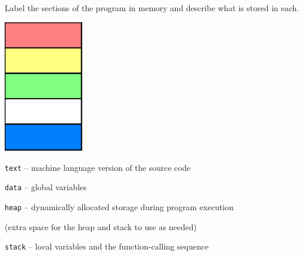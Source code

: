Label the sections of the program in memory and describe what is stored in each.

\begin{minipage}{0.2\textwidth}
	\includegraphics[width=35mm]{other/programstructure.png}
\end{minipage}
\begin{minipage}{0.7\textwidth}
	\begin{answer}

	\texttt{text} -- machine language version of the source code

	\bigskip \medskip

	\texttt{data} -- global variables

	\bigskip \medskip

	\texttt{heap} -- dynamically allocated storage during program execution

	\bigskip \medskip

	(extra space for the heap and stack to use as needed)

	\bigskip \medskip

	\texttt{stack} -- local variables and the function-calling sequence

	\end{answer}
\end{minipage} \hfill




